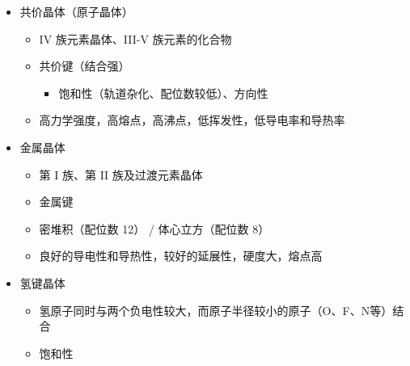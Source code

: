 \begin{itemize}
    \item 共价晶体（原子晶体）\begin{itemize}
              \item IV 族元素晶体、III-V 族元素的化合物
              \item 共价键（结合强）\begin{itemize}
                        \item 饱和性（轨道杂化、配位数较低）、方向性
                    \end{itemize}
              \item 高力学强度，高熔点，高沸点，低挥发性，低导电率和导热率
          \end{itemize}
    \item 金属晶体\begin{itemize}
              \item 第 I 族、第 II 族及过渡元素晶体
              \item 金属键
              \item 密堆积（配位数 12） / 体心立方（配位数 8）
              \item 良好的导电性和导热性，较好的延展性，硬度大，熔点高
          \end{itemize}
    \item 氢键晶体\begin{itemize}
              \item 氢原子同时与两个负电性较大，而原子半径较小的原子（O、F、N等）结合
              \item 饱和性
          \end{itemize}
\end{itemize}